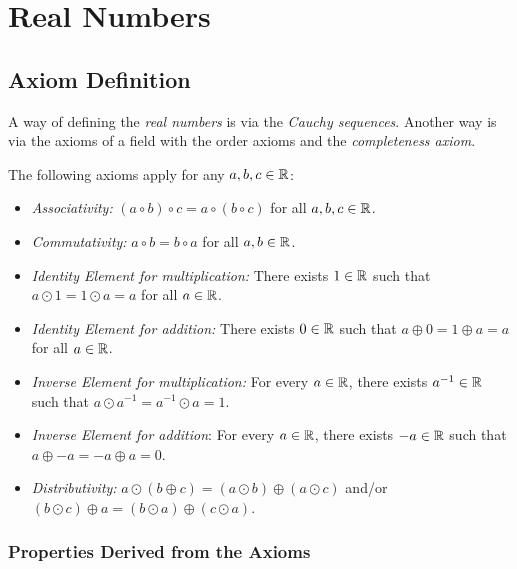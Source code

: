 \chapter{Real Numbers}

\section{Axiom Definition}

A way of defining the \emph{real numbers} is via the \emph{Cauchy sequences}. Another way is via
the axioms of a field with the order axioms and the \emph{completeness axiom}.

The following axioms apply for any \(a, b, c \in \mathbb{R}\):

\begin{itemize}

	\item \emph{Associativity:} \((a \circ b) \circ c = a \circ (b \circ c)\) for all \(a,b,c \in \mathbb{R}\).

	\item \emph{Commutativity:} \(a \circ b = b \circ a\) for all \(a,b \in \mathbb{R}\).

	\item \emph{Identity Element for multiplication:} There exists \(1 \in \mathbb{R}\) such that \(a \odot 1 = 1 \odot a = a\) for all \(a \in \mathbb{R}\).

	\item \emph{Identity Element for addition:} There exists \(0 \in \mathbb{R}\) such that \(a \oplus 0 = 1 \oplus a = a\) for all \(a \in \mathbb{R}\).

	\item \emph{Inverse Element for multiplication:} For every \(a \in \mathbb{R}\), there exists \(a^{-1} \in \mathbb{R}\) such that \(a \odot a^{-1} = a^{-1} \odot a = 1\).

	\item \emph{Inverse Element for addition}: For every \(a \in \mathbb{R}\), there exists \(-a \in \mathbb{R}\) such that \(a \oplus -a = -a \oplus a = 0\).

	\item \emph{Distributivity:} \(a \odot (b \oplus c) = (a \odot b) \oplus (a \odot c)\) and/or \((b \odot c) \oplus a = (b \odot a) \oplus (c \odot a)\).

\end{itemize}

\subsection{Properties Derived from the Axioms}

